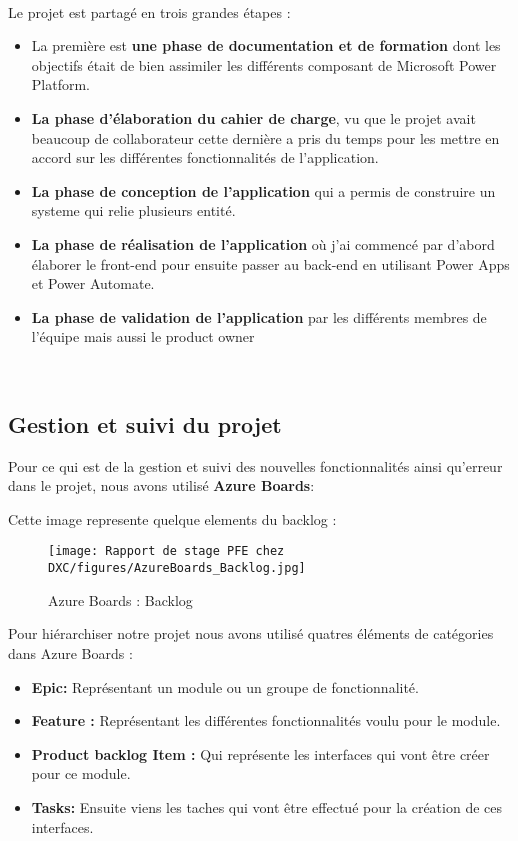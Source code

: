 \\
Le projet est partagé en trois grandes étapes : 
\\
\begin{itemize}
  \item La première est \textbf{une phase de documentation et de formation} dont les objectifs était de bien assimiler les différents composant de Microsoft Power Platform.
  \\
  \item \textbf{La phase d'élaboration du cahier de charge}, vu que le projet avait beaucoup de collaborateur cette dernière a pris du temps pour les mettre en accord sur les différentes fonctionnalités de l'application.
  \\
  \item \textbf{La phase de conception de l'application} qui a permis de construire un systeme qui relie plusieurs entité.
  \\
  \item \textbf{La phase de réalisation de l'application} où j'ai commencé par d'abord élaborer le front-end pour ensuite passer au back-end en utilisant Power Apps et Power Automate.
  \\
  \item \textbf{La phase de validation de l'application} par les différents membres de l'équipe mais aussi le product owner
  \\
\end{itemize}
\\

\subsection{Gestion et suivi du projet}
Pour ce qui est de la gestion et suivi des nouvelles fonctionnalités ainsi qu'erreur dans le projet, nous avons utilisé \textbf{Azure Boards}: 

Cette image represente quelque elements du backlog :

\begin{figure}[!h]
    \centering
    \texttt{[image: Rapport de stage PFE chez DXC/figures/AzureBoards\_Backlog.jpg]}
    \caption{Azure Boards : Backlog}
\end{figure}

Pour hiérarchiser notre projet nous avons utilisé quatres éléments de catégories dans Azure Boards :
\\

\begin{itemize}
  \item \textbf{Epic:} Représentant un module ou un groupe de fonctionnalité.
  \item \textbf{Feature :} Représentant les différentes fonctionnalités voulu pour le module.
  \item \textbf{Product backlog Item :} Qui représente les interfaces qui vont être créer pour ce module.
  \item \textbf{Tasks:} Ensuite viens les taches qui vont être effectué pour la création de ces interfaces.
\end{itemize}

